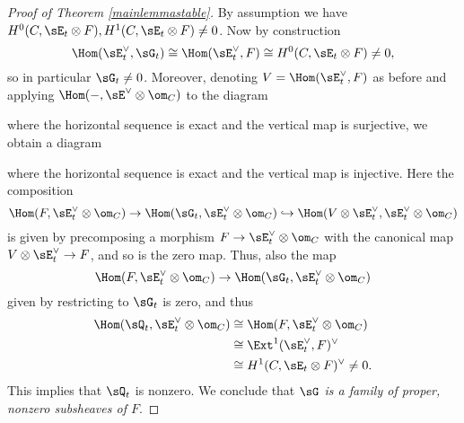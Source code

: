 \begin{proof}[Proof of Theorem \ref{mainlemmastable}]
By assumption we have $H^0(C, \sE_t \otimes F), H^1(C, \sE_t \otimes F) \neq 0$. Now by construction
\[ \Hom(\sE_t^\vee, \sG_t) \cong \Hom(\sE_t^\vee, F) \cong H^0(C, \sE_t \otimes F) \neq 0, \]
so in particular $\sG_t \neq 0$. Moreover, denoting $V = \Hom(\sE_t^\vee, F)$ as before and applying $\Hom(-, \sE^\vee \otimes \om_C)$ to the diagram
\begin{center}
\end{center}
where the horizontal sequence is exact and the vertical map is surjective, we obtain a diagram
\begin{center}
\end{center}
where the horizontal sequence is exact and the vertical map is injective. Here the composition
\[ \Hom(F, \sE_t^\vee \otimes \om_C) \to \Hom(\sG_t, \sE_t^\vee \otimes \om_C) \hookrightarrow \Hom(V \otimes \sE_t^\vee, \sE_t^\vee \otimes \om_C) \]
is given by precomposing a morphism $F \to \sE_t^\vee \otimes \om_C$ with the canonical map $V \otimes \sE_t^\vee \to F$, and so is the zero map. Thus, also the map
\[ \Hom(F, \sE_t^\vee \otimes \om_C) \to \Hom(\sG_t, \sE_t^\vee \otimes \om_C) \]
given by restricting to $\sG_t$ is zero, and thus 
\begin{align*}
    \Hom(\sQ_t, \sE_t^\vee \otimes \om_C) & \cong \Hom(F, \sE_t^\vee \otimes \om_C) \\
    & \cong \Ext^1(\sE_t^\vee, F)^\vee \\
    & \cong H^1(C, \sE_t \otimes F)^\vee \neq 0.
\end{align*}
This implies that $\sQ_t$ is nonzero. We conclude that \emph{$\sG$ is a family of proper, nonzero subsheaves of $F$}.


\end{proof}
